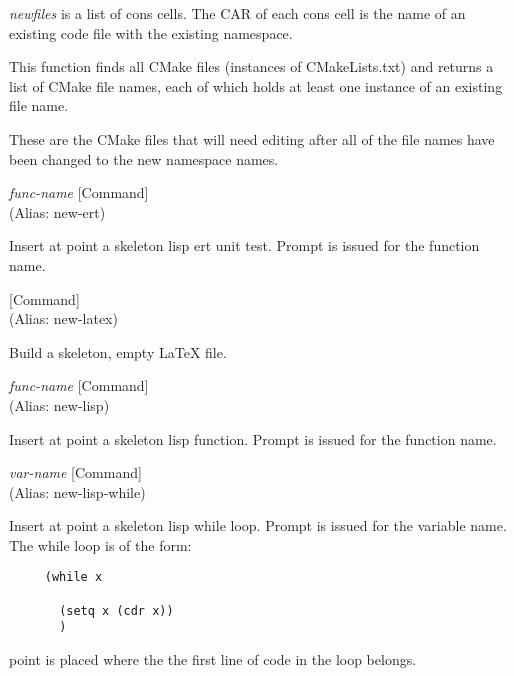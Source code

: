 \begin{doc-string}
\emph{newfiles} is a list of cons cells.  The CAR of each cons cell is the name of
an existing code file with the existing namespace.

This function finds all CMake files (instances of CMakeLists.txt) and returns a
list of CMake file names, each of which holds at least one instance of an
existing file name.

These are the CMake files that will need editing after all of the file names
have been changed to the new namespace names.
\end{doc-string}

\vspace{1em}
\noindent
{}
\usebox{\funcname}\emph{func-name}
 \hfill [Command]\\%
 (Alias: new-ert)

\begin{doc-string}
Insert at point a skeleton lisp ert unit test.  Prompt is issued for the
function name.
\end{doc-string}

\vspace{1em}
\noindent
{}
\usebox{\funcname}
 \hfill [Command]\\%
 (Alias: new-latex)

\begin{doc-string}
Build a skeleton, empty LaTeX file.
\end{doc-string}

\vspace{1em}
\noindent
{}
\usebox{\funcname}\emph{func-name}
 \hfill [Command]\\%
 (Alias: new-lisp)

\begin{doc-string}
Insert at point a skeleton lisp function.  Prompt is issued for the function
name.
\end{doc-string}

\vspace{1em}
\noindent
{}
\usebox{\funcname}\emph{var-name}
 \hfill [Command]\\%
 (Alias: new-lisp-while)

\begin{doc-string}
Insert at point a skeleton lisp while loop.  Prompt is issued for the
variable name.  The while loop is of the form:

\small{\begin{verbatim}
     (while x

       (setq x (cdr x))
       )
\end{verbatim}}
point is placed where the the first line of code in the loop belongs.
\end{doc-string}

